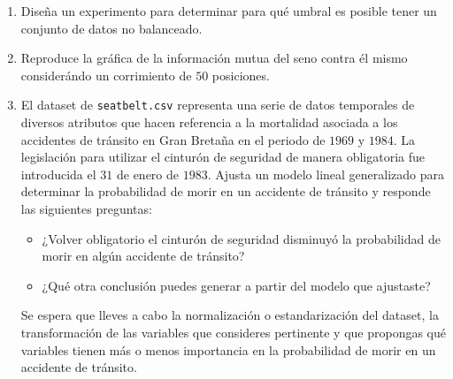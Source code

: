 \documentclass[letterpaper,11pt]{article}
\begin{document}
\begin{enumerate}
    \item Diseña un experimento para determinar para qué umbral es posible tener 
    un conjunto de datos no balanceado.

    \item Reproduce la gráfica de la información mutua del seno contra él mismo 
    considerándo un corrimiento de $50$ posiciones.

    \item El dataset de \texttt{seatbelt.csv} representa una serie de datos 
    temporales de diversos atributos que hacen referencia a la mortalidad 
    asociada a los accidentes de tránsito en Gran Bretaña en el periodo de 
    $1969$ y $1984$. La legislación para utilizar el cinturón de seguridad de 
    manera obligatoria fue introducida el $31$ de enero de $1983$. Ajusta un 
    modelo lineal generalizado para determinar la probabilidad de morir en 
    un accidente de tránsito y responde las siguientes preguntas:
    \begin{itemize}
        \item ¿Volver obligatorio el cinturón de seguridad disminuyó la 
        probabilidad de morir en algún accidente de tránsito?

        \item ¿Qué otra conclusión puedes generar a partir del modelo que 
        ajustaste? 
    \end{itemize}

    Se espera que lleves a cabo la normalización o estandarización del 
    dataset, la transformación de las variables que consideres pertinente y 
    que propongas qué variables tienen más o menos importancia en la 
    probabilidad de morir en un accidente de tránsito.
\end{enumerate}
\end{document}
